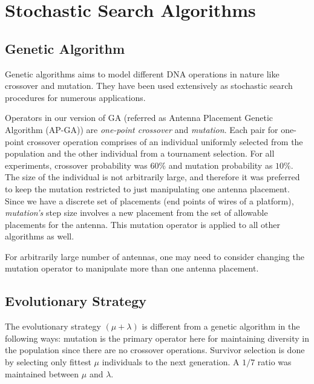 \documentclass[conference]{IEEEtran}
\begin{document}
\section{Stochastic Search Algorithms}
\label{sec:algorithms}
\subsection{Genetic Algorithm}
\label{sec:algorithms-ga}
Genetic algorithms aims to model different DNA operations in nature like crossover and mutation. They have been used extensively as stochastic search procedures for numerous applications. 

Operators in our version of GA (referred as Antenna Placement Genetic Algorithm (AP-GA)) are \textit{one-point crossover} and \textit{mutation}. Each pair for one-point crossover operation comprises of an individual uniformly selected from the population and the other individual from a tournament selection. For all experiments, crossover probability was $60\%$ and mutation probability as $10\%$. The size of the individual is not arbitrarily large, and therefore it was preferred to keep the mutation restricted to just manipulating one antenna placement. Since we have a discrete set of placements (end points of wires of a platform), \textit{mutation's} step size involves a new placement from the set of allowable placements for the antenna. This mutation operator is applied to all other algorithms as well.

For arbitrarily large number of antennas, one may need to consider changing the mutation operator to manipulate more than one antenna placement. 
\subsection{Evolutionary Strategy}
\label{sec:algorithms-es}
The evolutionary strategy $(\mu + \lambda)$ is different from a genetic algorithm in the following ways: 
mutation is the primary operator here for maintaining diversity in the population since there are no crossover operations. Survivor selection is done by selecting only fittest $\mu$ individuals to the next generation. A $1/7$ ratio was maintained between $\mu$ and $\lambda$. 
\end{document}
